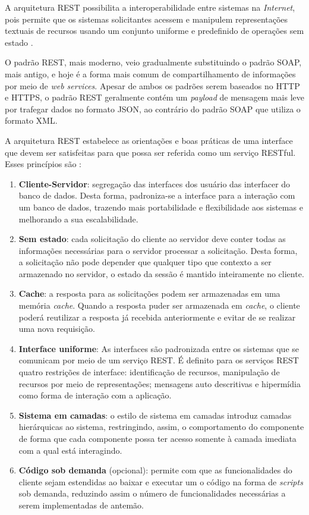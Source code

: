 A arquitetura REST possibilita a interoperabilidade entre sistemas na \textit{Internet}, pois permite que os sistemas solicitantes acessem e manipulem representações textuais de recursos usando um conjunto uniforme e predefinido de operações sem estado \cite{ferris2004webservices}.

O padrão REST, mais moderno, veio gradualmente substituindo o padrão SOAP, mais antigo, e hoje é a forma mais comum de compartilhamento de informações por meio de \textit{web services}. Apesar de ambos os padrões serem baseados no HTTP e HTTPS, o padrão REST geralmente contém um \textit{payload} de mensagem mais leve por trafegar dados no formato JSON, ao contrário do padrão SOAP que utiliza o formato XML.

A arquitetura REST estabelece as orientações e boas práticas de uma interface que devem ser satisfeitas  para que possa ser referida como um serviço RESTful. Esses princípios são \cite{fielding2000rest}:

\begin{enumerate}
	\item \textbf{Cliente-Servidor}:  segregação das interfaces dos usuário das interfacer do banco de dados. Desta forma, padroniza-se a interface para a interação com um banco de dados, trazendo mais portabilidade e flexibilidade aos sistemas e melhorando a sua escalabilidade.

	\item \textbf{Sem estado}: cada solicitação do cliente ao servidor deve conter todas as informações necessárias para o servidor processar a solicitação. Desta forma, a solicitação não pode depender que qualquer tipo que contexto a ser armazenado no servidor, o estado da sessão é mantido inteiramente no cliente.

	\item \textbf{Cache}:  a resposta para as solicitações podem ser armazenadas em uma memória \textit{cache}. Quando a resposta puder ser armazenada em \textit{cache}, o cliente poderá reutilizar a resposta já recebida anteriormente e evitar de se realizar uma nova requisição.

	\item \textbf{Interface uniforme}: As interfaces são padronizada entre os sistemas que se comunicam por meio de um serviço REST.  É definito para os serviços REST quatro restrições de interface: identificação de recursos, manipulação de recursos por meio de representações; mensagens auto descritivas e hipermídia como forma de interação com a aplicação.

	\item \textbf{Sistema em camadas}: o estilo de sistema em camadas introduz camadas hierárquicas  ao sistema, restringindo, assim, o comportamento do componente de forma que cada componente possa ter acesso somente à camada imediata com a qual está interagindo.

	\item \textbf{Código sob demanda} (opcional): permite com que as funcionalidades do cliente sejam estendidas ao baixar e executar um o código na forma de \textit{scripts} sob demanda, reduzindo assim o número de funcionalidades necessárias a serem implementadas de antemão.
\end{enumerate}

